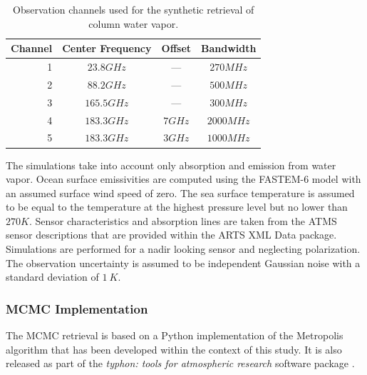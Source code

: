 \documentclass[journal abbreviation, manuscript]{copernicus}
\begin{document}
\begin{table}[hbpt]
\centering
\begin{tabular}{|r|c|c|c|}
    \hline
    Channel & Center Frequency & Offset           & Bandwidth                \\ 
    \hline
                  1 & $23.8 \unit{GHz}$ &        ---       & $270 \unit{MHz}$ \\
                  2 & $88.2 \unit{GHz}$ &        ---       & $500 \unit{MHz}$ \\
                  3 & $165.5\unit{GHz}$ &        ---       & $300 \unit{MHz}$ \\
                  4 & $183.3\unit{GHz}$ & $7   \unit{GHz}$ & $2000\unit{MHz}$ \\
                  5 & $183.3\unit{GHz}$ & $3   \unit{GHz}$ & $1000\unit{MHz}$ \\
    \hline
\end{tabular}
\caption{Observation channels used for the synthetic retrieval of column water vapor.}
\label{tab:channels}
\end{table}

The simulations take into account only absorption and emission from water
vapor. Ocean surface emissivities are computed using the FASTEM-6
\citep{fastem6} model with an assumed surface wind speed of zero. The sea
surface temperature is assumed to be equal to the temperature at the highest
pressure level but no lower than $270\unit{K}$. Sensor characteristics and
absorption lines are taken from the ATMS sensor descriptions that are provided
within the ARTS XML Data package. Simulations are performed for a nadir looking
sensor and neglecting polarization. The observation uncertainty is assumed to be
independent Gaussian noise with a standard deviation of $1\:\unit{K}$.


\subsubsection{MCMC Implementation}

  The MCMC retrieval is based on a Python implementation of the Metropolis
  algorithm \citep[Ch. 12]{bda} that has been developed within the context of
  this study. It is also released as part of the \textit{typhon: tools for atmospheric
  research} software package \citep{typhon}.
\end{document}
